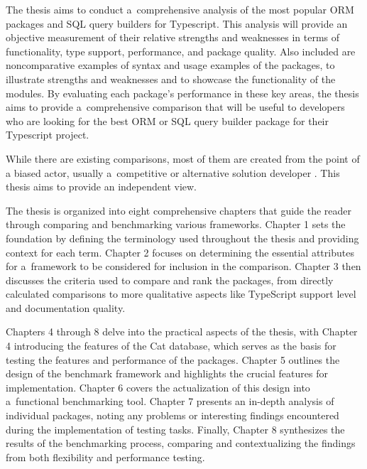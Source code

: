 The thesis aims to conduct a~comprehensive analysis of the most popular ORM
packages and SQL query builders for Typescript. This analysis will provide an
objective measurement of their relative strengths and weaknesses in terms of
functionality, type support, performance, and package quality. Also included are
noncomparative examples of syntax and usage examples of the packages, to
illustrate strengths and weaknesses and to showcase the functionality of the
modules. By evaluating each package's performance in these key areas, the thesis
aims to provide a~comprehensive comparison that will be useful to developers who
are looking for the best ORM or SQL query builder package for their Typescript
project.

While there are existing comparisons, most of them are created from the point of
a biased actor, usually a~competitive or alternative solution developer
\cite{drizzleComparison} \cite{imdbBench}. This thesis aims to provide an
independent view.


The thesis is organized into eight comprehensive chapters that guide the reader
through comparing and benchmarking various frameworks. Chapter 1 sets the
foundation by defining the terminology used throughout the thesis and providing
context for each term. Chapter 2 focuses on determining the essential attributes
for a~framework to be considered for inclusion in the comparison. Chapter 3 then
discusses the criteria used to compare and rank the packages, from directly
calculated comparisons to more qualitative aspects like TypeScript support level
and documentation quality.

Chapters 4 through 8 delve into the practical aspects of the thesis, with
Chapter 4 introducing the features of the Cat database, which serves as the
basis for testing the features and performance of the packages. Chapter 5
outlines the design of the benchmark framework and highlights the crucial
features for implementation. Chapter 6 covers the actualization of this design
into a~functional benchmarking tool. Chapter 7 presents an in-depth analysis of
individual packages, noting any problems or interesting findings encountered
during the implementation of testing tasks. Finally, Chapter 8 synthesizes the
results of the benchmarking process, comparing and contextualizing the findings
from both flexibility and performance testing.
